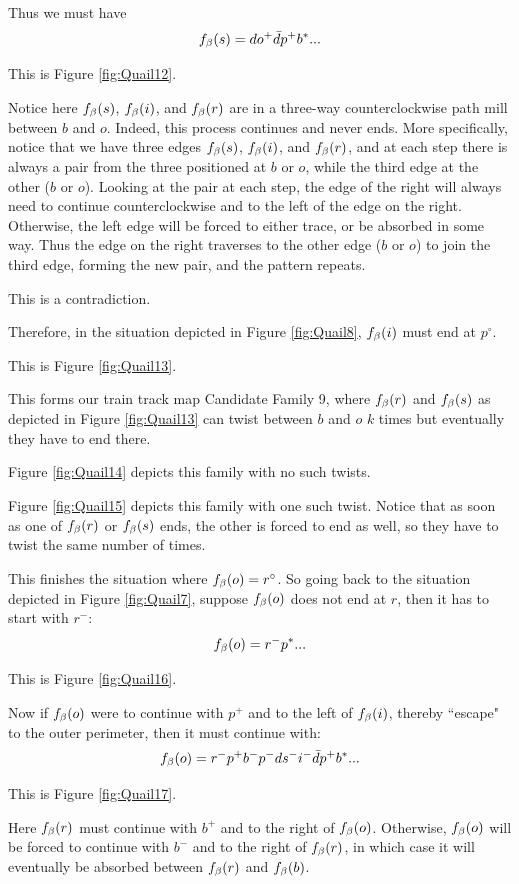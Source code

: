 Thus we must have
\[
f_\beta(s) = d o^+\bar{d} p^+ b^*...
\]

This is Figure \ref{fig:Quail12}.

Notice here $f_\beta(s)$, $f_\beta(i)$, and $f_\beta(r)$ are in a three-way counterclockwise path mill between $b$ and $o$. Indeed, this process continues and never ends. More specifically, notice that we have three edges $f_\beta(s)$, $f_\beta(i)$, and $f_\beta(r)$, and at each step there is always a pair from the three positioned at $b$ or $o$, while the third edge at the other ($b$ or $o$). Looking at the pair at each step, the edge of the right will always need to continue counterclockwise and to the left of the edge on the right. Otherwise, the left edge will be forced to either trace, or be absorbed in some way. Thus the edge on the right traverses to the other edge ($b$ or $o$) to join the third edge, forming the new pair, and the pattern repeats.

This is a contradiction.

Therefore, in the situation depicted in Figure \ref{fig:Quail8}, $f_\beta(i)$ must end at $p^\circ$. 

This is Figure \ref{fig:Quail13}.

This forms our train track map Candidate Family 9, where $f_\beta(r)$ and $f_\beta(s)$ as depicted in Figure \ref{fig:Quail13} can twist between $b$ and $o$ $k$ times but eventually they have to end there. 


Figure \ref{fig:Quail14} depicts this family with no such twists.


Figure \ref{fig:Quail15} depicts this family with one such twist. Notice that as soon as one of $f_\beta(r)$ or $f_\beta(s)$ ends, the other is forced to end as well, so they have to twist the same number of times.

This finishes the situation where $f_\beta(o) = r^\circ$. So going back to the situation depicted in Figure \ref{fig:Quail7}, suppose $f_\beta(o)$ does not end at $r$, then it has to start with $r^-$:
\[
f_\beta(o) = r^- p^*...
\]

This is Figure \ref{fig:Quail16}.


Now if $f_\beta(o)$ were to continue with $p^+$ and to the left of $f_\beta(i)$, thereby ``escape" to the outer perimeter, then it must continue with:
\[
f_\beta(o) = r^- p^+ b^- p^- d s^- i^- \bar{d} p^+ b^*...
\]

This is Figure \ref{fig:Quail17}.

Here $f_\beta(r)$ must continue with $b^+$ and to the right of $f_\beta(o)$. Otherwise, $f_\beta(o)$ will be forced to continue with $b^-$ and to the right of $f_\beta(r)$, in which case it will eventually be absorbed between $f_\beta(r)$ and $f_\beta(b)$. 

